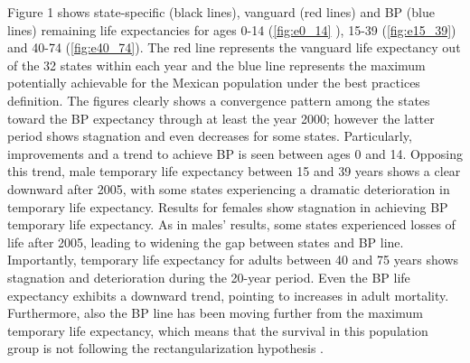 \documentclass{article}
\begin{document}
\begin{spacing}{1.5}
Figure 1 shows state-specific  (black lines), vanguard  (red lines) and BP (blue lines) remaining life expectancies for ages 0-14 (\ref{fig:e0_14} ), 15-39
(\ref{fig:e15_39}) and 40-74 (\ref{fig:e40_74}). The red line represents the
vanguard life expectancy out of the 32 states within each year and the blue line
represents the maximum potentially achievable for the Mexican population under
the best practices definition.
The figures clearly shows a convergence pattern among the states toward the BP
expectancy through at least the year 2000; however the latter period shows
stagnation and even decreases for some states. Particularly, improvements and a trend to achieve BP is seen between ages 0 and 14. Opposing this trend, male temporary life expectancy between 15 and 39 years shows a clear downward after 2005, with some states experiencing a dramatic deterioration in temporary life expectancy. Results for females show stagnation in achieving BP temporary life expectancy. As in males' results, some states experienced losses of life after 2005, leading to widening the gap between states and BP line. 
Importantly, temporary life expectancy for adults between 40 and 75 years shows stagnation and deterioration during the 20-year period. Even the BP life expectancy exhibits a downward trend, pointing to increases in adult mortality. Furthermore, also the BP line has been moving further from the maximum temporary life expectancy, which means that the survival in this population group is not following the rectangularization hypothesis \citep{wilmoth1999}. 



\end{spacing}
\end{document}
